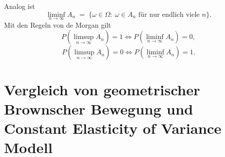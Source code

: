 \begin{bem}
Analog ist
$$
\liminf_{n\to\infty} A_n \;=\; \{\omega\in\Omega:\ \omega\in A_n\text{ für nur endlich viele }n\}.
$$
Mit den Regeln von de Morgan gilt
$$P(\limsup_{n \to \infty} A_n) = 1 \iff P(\liminf_{n \to \infty} A_n) = 0,$$
$$P(\limsup_{n \to \infty} A_n) = 0 \iff P(\liminf_{n \to \infty} A_n) = 1.$$
\end{bem}

\newpage
\section{Vergleich von geometrischer Brownscher Bewegung und Constant Elasticity of Variance Modell}

\begin{center}
    \begin{sideways}
    \end{sideways}
    \label{fig:table_gbm_cev}
\end{center}
